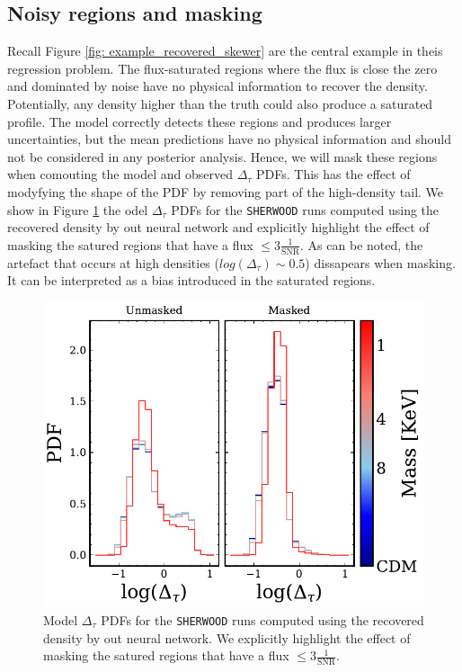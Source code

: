\subsection{Noisy regions and masking}
Recall Figure \ref{fig: example_recovered_skewer} are the central example in theis regression problem. The flux-saturated regions where the flux is close the zero and dominated by noise have no physical information to recover the density. Potentially, any density higher than the truth could also produce a saturated profile. The model correctly detects these regions and produces larger uncertainties, but the mean predictions have no physical information and should not be considered in any posterior analysis. Hence, we will mask these regions when comouting the model and observed $\Delta_\tau$ PDFs. This has the effect of modyfying the shape of the PDF by removing part of the high-density tail. We show in Figure \ref{fig: PDF masked unmasked} the odel $\Delta_\tau$ PDFs for the \texttt{SHERWOOD} runs computed using the recovered density by out neural network and explicitly highlight the effect of masking the satured regions that have a flux $\leq 3\frac{1}{\mathrm{SNR}}$. As can be noted, the artefact that occurs at high densities  ($log(\Delta_\tau) \sim 0.5$) dissapears when masking. It can be interpreted as a bias introduced in the saturated regions.

\begin{figure}
    \centering
    \includegraphics[width=0.85\linewidth]{img/ML/PDF_masked_unmasked.pdf}
    \caption{Model $\Delta_\tau$ PDFs for the \texttt{SHERWOOD} runs computed using the recovered density by out neural network. We explicitly highlight the effect of masking the satured regions that have a flux $\leq 3\frac{1}{\mathrm{SNR}}$. }
    \label{fig: PDF masked unmasked}
\end{figure}


